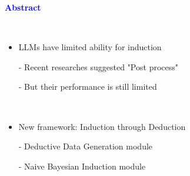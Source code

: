 \documentclass[professionalfont]{beamer}
\begin{document}
\frame{\titlepage}


\begin{frame}
\begin{center}
    { \textbf{\textcolor{blue}{ {\fontsize{12}{14}\selectfont Abstract} }} }
\end{center}
\\[0.5cm]

{\fontsize{10}{14}\selectfont 
\begin{itemize}
    \item LLMs have limited ability for induction
    
    - Recent researches suggested "Post process"
    
    - But their performance is still limited
\end{itemize}
\\[0.5cm]

\begin{itemize}
    \item New framework: Induction through Deduction
    
    - Deductive Data Generation module
    
    - Naive Bayesian Induction module
\end{itemize}
}

\end{frame}
\end{document}
